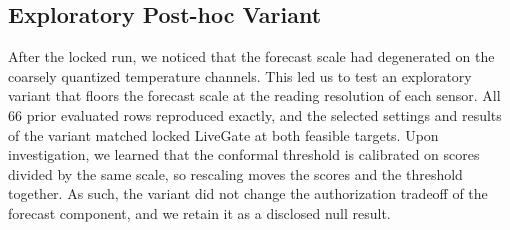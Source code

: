 \subsection{Exploratory Post-hoc Variant}
After the locked run, we noticed that the forecast scale had degenerated on the coarsely quantized temperature channels. This led us to test an exploratory variant that floors the forecast scale at the reading resolution of each sensor. All 66 prior evaluated rows reproduced exactly, and the selected settings and results of the variant matched locked LiveGate at both feasible targets. Upon investigation, we learned that the conformal threshold is calibrated on scores divided by the same scale, so rescaling moves the scores and the threshold together. As such, the variant did not change the authorization tradeoff of the forecast component, and we retain it as a disclosed null result.
